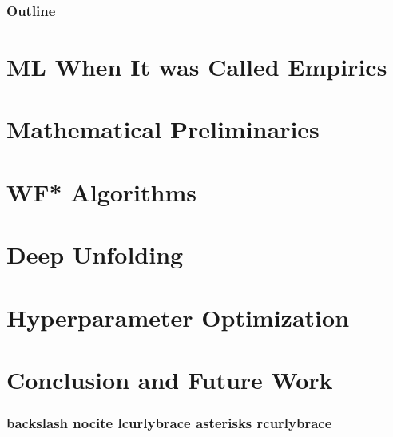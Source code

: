 \documentclass{beamer}
\theoremstyle{definition}
\theoremstyle{remark}
\begin{document}


\begin{frame}
\frametitle{Outline}
\tableofcontents[pausesections]
\end{frame}



\section[ML When It was Called Empirics]{ML When It was Called Empirics}


\section[Mathematical Preliminaries]{Mathematical Preliminaries}


\section[WF* Algorithms]{WF* Algorithms}


\section[Deep Unfolding]{Deep Unfolding}


\section[Hyperparameter Optimization]{Hyperparameter Optimization}

\section[Conclusion and Future Work]{Conclusion and Future Work}

  \begin{frame}[allowframebreaks]
  \frametitle{backslash nocite lcurlybrace asterisks rcurlybrace}
  \nocite{*}
  \printbibliography 
  \end{frame}
  
\end{document}
